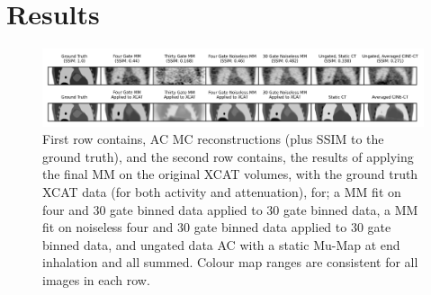 \section{Results} \label{sec:results}
    \begin{figure}
        \vspace{-0.5cm}
        
        \centering
        
        \includegraphics[width=0.93\linewidth]{figures/visual_analysis.png}
        
        \vspace{-0.5cm}
        
        \captionsetup{singlelinecheck=false, justification=centering}
        \caption{
        \scriptsize
        First row contains, \gls{AC} \gls{MC} reconstructions (plus \acrshort{SSIM} to the ground truth), and the second row contains, the results of applying the final \gls{MM} on the original \acrshort{XCAT} volumes, with the ground truth \acrshort{XCAT} data (for both activity and attenuation), for; a \gls{MM} fit on four and $30$ gate binned data applied to $30$ gate binned data, a \gls{MM} fit on noiseless four and $30$ gate binned data applied to $30$ gate binned data, and ungated data \gls{AC} with a static \gls{Mu-Map} at end inhalation and all  summed. Colour map ranges are consistent for all images in each row.}
        
        \label{fig:visual_analysis}
        
        \vspace{-0.5cm}
    \end{figure}
    
